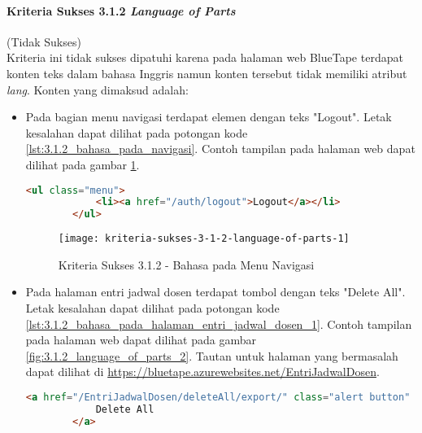 \paragraph{Kriteria Sukses 3.1.2 \textit{Language of Parts}}
\label{par:kepatuhan_bluetape_kriteria_sukses_3.1.2}
(Tidak Sukses)\\

Kriteria ini tidak sukses dipatuhi karena pada halaman web BlueTape terdapat konten teks dalam bahasa Inggris namun konten tersebut tidak memiliki atribut \textit{lang}. Konten yang dimaksud adalah:

\begin{itemize}
    \item Pada bagian menu navigasi terdapat elemen dengan teks "Logout". Letak kesalahan dapat dilihat pada potongan kode \ref{lst:3.1.2_bahasa_pada_navigasi}. Contoh tampilan pada halaman web dapat dilihat pada gambar \ref{fig:3.1.2_language_of_parts_1}. 
    \begin{lstlisting}[frame=single, label={lst:3.1.2_bahasa_pada_navigasi}, language=HTML, caption=Kriteria Sukses 3.1.2 - Bahasa yang Tidak Sesuai pada Menu Navigasi]
        <ul class="menu">
            <li><a href="/auth/logout">Logout</a></li>
        </ul>
    \end{lstlisting}
    
    \begin{figure}[H]
        \centering  
        \texttt{[image: kriteria-sukses-3-1-2-language-of-parts-1]}  
        \caption[Kriteria Sukses 3.1.2 - Bahasa pada Menu Navigasi]{Kriteria Sukses 3.1.2 - Bahasa pada Menu Navigasi}
        \label{fig:3.1.2_language_of_parts_1}  
    \end{figure}

    \item Pada halaman entri jadwal dosen terdapat tombol dengan teks "Delete All". Letak kesalahan dapat dilihat pada potongan kode \ref{lst:3.1.2_bahasa_pada_halaman_entri_jadwal_dosen_1}. Contoh tampilan pada halaman web dapat dilihat pada gambar \ref{fig:3.1.2_language_of_parts_2}. Tautan untuk halaman yang bermasalah dapat dilihat di \url{https://bluetape.azurewebsites.net/EntriJadwalDosen}.
    \begin{lstlisting}[frame=single, label={lst:3.1.2_bahasa_pada_halaman_entri_jadwal_dosen_1}, language=HTML, caption=Kriteria Sukses 3.1.2 - Bahasa yang Tidak Sesuai pada Halaman Entri Jadwal Dosen 1]
        <a href="/EntriJadwalDosen/deleteAll/export/" class="alert button" onClick="return konfirmasi();">
            Delete All
        </a>
    \end{lstlisting}
    

\end{itemize}
